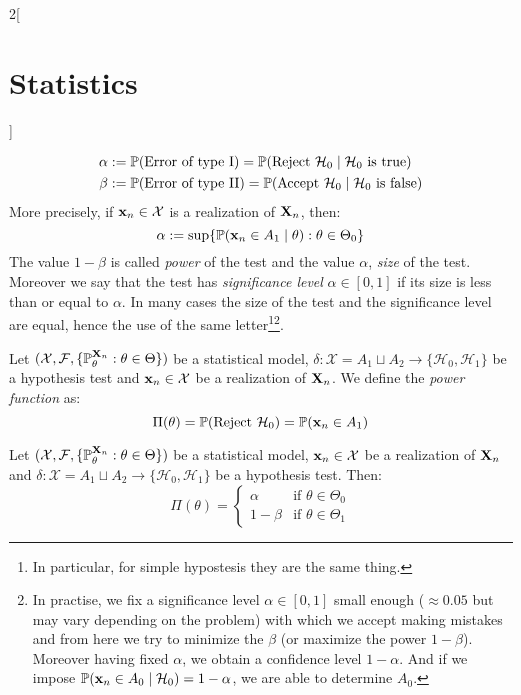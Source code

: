 \documentclass[../../../main.tex]{subfiles}
\begin{document}
\begin{multicols}{2}[\section{Statistics}]
\begin{definition}
    \begin{align*}
      \alpha & :=\mathbb{P}(\text{Error of type I})=\mathbb{P}(\text{Reject $\mathcal{H}_0$}\mid\text{$\mathcal{H}_0$ is true})   \\
      \beta  & :=\mathbb{P}(\text{Error of type II})=\mathbb{P}(\text{Accept $\mathcal{H}_0$}\mid\text{$\mathcal{H}_0$ is false})
    \end{align*}
    More precisely, if $\boldsymbol{\mathrm{x}}_n\in\mathcal{X}$ is a realization of $\boldsymbol{\mathrm{X}}_n$, then: $$\alpha:=\sup\{\mathbb{P}(\boldsymbol{\mathrm{x}}_n\in A_1\mid \theta):\theta\in\Theta_0\}$$
    The value $1-\beta$ is called \emph{power} of the test and the value $\alpha$, \emph{size} of the test. Moreover we say that the test has \emph{significance level} $\alpha\in[0,1]$ if its size is less than or equal to $\alpha$. In many cases the size of the test and the significance level are equal, hence the use of the same letter\footnote{In particular, for simple hypostesis they are the same thing.}\footnote{In practise, we fix a significance level $\alpha\in[0,1]$ small enough ($\approx 0.05$ but may vary depending on the problem) with which we accept making mistakes and from here we try to minimize the $\beta$ (or maximize the power $1-\beta$). Moreover having fixed $\alpha$, we obtain a confidence level $1-\alpha$. And if we impose $\mathbb{P}(\boldsymbol{\mathrm{x}}_n\in A_0\mid \mathcal{H}_0)=1-\alpha$, we are able to determine $A_0$.}.
  \end{definition}
  \begin{definition}
    Let $(\mathcal{X},\mathcal{F},\{\mathbb{P}_\theta^{\boldsymbol{\mathrm{X}}_n}:\theta\in\Theta\})$ be a statistical model, $\delta:\mathcal{X}=A_1\sqcup A_2\rightarrow\{\mathcal{H}_0,\mathcal{H}_1\}$ be a hypothesis test and $\boldsymbol{\mathrm{x}}_n\in\mathcal{X}$ be a realization of $\boldsymbol{\mathrm{X}}_n$. We define the \emph{power function} as: $$\Pi(\theta)=\mathbb{P}(\text{Reject $\mathcal{H}_0$})=\mathbb{P}(\boldsymbol{\mathrm{x}}_n\in A_1)$$
  \end{definition}
  \begin{proposition}
    Let $(\mathcal{X},\mathcal{F},\{\mathbb{P}_\theta^{\boldsymbol{\mathrm{X}}_n}:\theta\in\Theta\})$ be a statistical model, $\boldsymbol{\mathrm{x}}_n\in\mathcal{X}$ be a realization of $\boldsymbol{\mathrm{X}}_n$ and $\delta:\mathcal{X}=A_1\sqcup A_2\rightarrow\{\mathcal{H}_0,\mathcal{H}_1\}$ be a hypothesis test. Then:
    $$
      \Pi(\theta)=
      \begin{cases}
        \alpha  & \text{if }\theta\in\Theta_0 \\
        1-\beta & \text{if }\theta\in\Theta_1
      \end{cases}
    $$
  \end{proposition}

\end{multicols}
\end{document}
